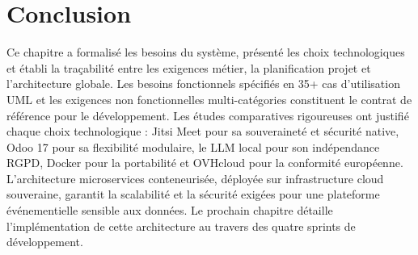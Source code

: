 \section*{Conclusion}
Ce chapitre a formalisé les besoins du système, présenté les choix technologiques et établi la traçabilité entre les exigences métier, la planification projet et l'architecture globale. Les besoins fonctionnels spécifiés en 35+ cas d'utilisation UML et les exigences non fonctionnelles multi-catégories constituent le contrat de référence pour le développement. Les études comparatives rigoureuses ont justifié chaque choix technologique : Jitsi Meet pour sa souveraineté et sécurité native, Odoo 17 pour sa flexibilité modulaire, le LLM local pour son indépendance RGPD, Docker pour la portabilité et OVHcloud pour la conformité européenne. L'architecture microservices conteneurisée, déployée sur infrastructure cloud souveraine, garantit la scalabilité et la sécurité exigées pour une plateforme événementielle sensible aux données. Le prochain chapitre détaille l'implémentation de cette architecture au travers des quatre sprints de développement.
